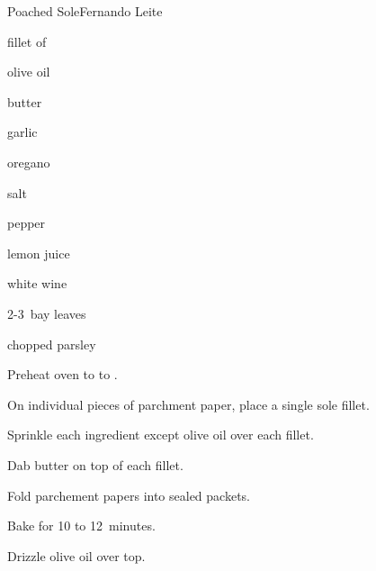\begin{recipe}{Poached Sole}{Fernando Leite}{}

\begin{ingredients}
\item fillet of 
\item olive oil
\item butter
\item garlic
\item oregano
\item salt
\item pepper
\item lemon juice
\item white wine
\item 2-3~bay leaves
\item chopped parsley
\end{ingredients}

\begin{directions}
\item Preheat oven to  to .
\item On individual pieces of parchment paper, place a single sole fillet.
\item Sprinkle each ingredient except olive oil over each fillet.
\item Dab butter on top of each fillet.
\item Fold parchement papers into sealed packets.
\item Bake for 10 to 12~minutes.
\item Drizzle olive oil over top.
\end{directions}

\end{recipe}
